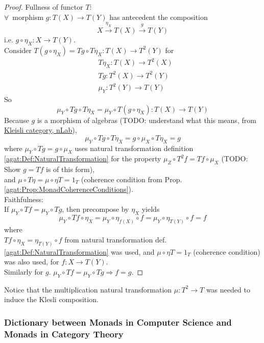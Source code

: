 \begin{proof}
	Fullness of functor $T$: \\
	
	$\forall \, $ morphism $g: T(X) \to T(Y)$ has antecedent the composition
	\[
	X\xrightarrow{ \eta_X} T(X) \xrightarrow{g} T(Y) 
	\]
	i.e. $g\circ \eta_X : X \to T(Y)$. \\
	
Consider $T(g \circ \eta_X) = Tg \circ T \eta_X : T(X) \to T^2(Y)$ for 
\[
\begin{aligned} 
	& T\eta_X : T(X) \to T^2(X) \\ 
	& Tg : T^2(X) \to T^2(Y) \\ 
	& \mu_Y : T^2(Y) \to T(Y) 
\end{aligned} 
\]
So 
\[
\mu_Y \circ Tg \circ T\eta_X = \mu_Y \circ T(g\circ \eta_X) : T(X) \to T(Y)
\]
Because $g$ is a morphism of algebras (TODO: understand what this means, from \href{https://ncatlab.org/nlab/show/Kleisli+category}{Kleisli category, nLab}), 
\[
\mu_Y \circ Tg \circ T\eta_X = g\circ \mu_X \circ T\eta_X = g
\]
where $\mu_Y \circ Tg = g\circ \mu_X$ uses natural transformation definition \ref{agat:Def:NaturalTransformation} for the property $\mu_Z \circ T^2 f = Tf \circ \mu_X$ (TODO: Show $g=Tf$ is of this form), \\
and $\mu \circ T\eta = \mu \circ \eta T = 1_T$ (coherence condition from Prop. \ref{agat:Prop:MonadCoherenceConditions}).  \\

Faithfulness: \\

If $\mu_Y \circ Tf = \mu_Y \circ Tg$, then precompose by $\eta_X$ yields 
\[
\mu_Y \circ Tf \circ \eta_X = \mu_Y \circ  \eta_{f(X)} \circ f = \mu_Y \circ \eta_{T(Y)} \circ f = f
\]
where \\
$Tf\circ \eta_X = \eta_{T(Y)} \circ f$ from natural transformation def. \ref{agat:Def:NaturalTransformation} was used, and $\mu \circ \eta T = 1_T$ (coherence condition) was also used, for $f:X \to T(Y)$. \\

Similarly for $g$. $\mu_Y \circ Tf = \mu_Y \circ Tg \Longrightarrow f=g$.
\end{proof} 

Notice that the multiplication natural transformation $\mu:T^2 \to T$ was needed to induce the Klesli composition.

\subsubsection{Dictionary between Monads in Computer Science and Monads in Category Theory}

